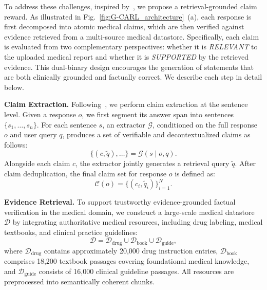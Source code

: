 \documentclass[letterpaper]{article} %
\begin{document}
To address these challenges, inspired by~\cite{factscore,veriscore}, we propose a retrieval-grounded claim  reward. 
As illustrated in Fig.~\ref{fig:G-CARL_architecture}~(a), each response is first decomposed into atomic medical claims, which are then verified against evidence retrieved from a multi-source medical datastore. 
Specifically, each claim is evaluated from two complementary perspectives: whether it is \emph{RELEVANT} to the uploaded medical report and whether it is \emph{SUPPORTED} by the retrieved evidence.
This dual-binary design encourages the generation of statements that are both clinically grounded and factually correct. We describe each step in detail below.

\vspace{2pt}
\noindent \textbf{Claim Extraction.}
Following~\cite{veriscore}, we perform claim extraction at the sentence level. Given a response $o$, we first segment its answer span into sentences $\{s_1, \dots, s_n\}$. For each sentence $s$, an extractor $\mathcal{G}$, conditioned on the full response $o$ and user query $q$, produces a set of verifiable and decontextualized claims as follows:
\begin{equation}
\{(c, \tilde{q}), \dots\}
=
\mathcal{G}(s \mid o, q).
\end{equation}
Alongside each claim $c$, the extractor jointly generates a retrieval query $\tilde{q}$. 
After claim deduplication, the final claim set for response $o$ is defined as:
\begin{equation}
\mathcal{C}(o)=\{(c_i,\tilde{q}_i)\}_{i=1}^{N}.
\end{equation}


\vspace{2pt}
\noindent \textbf{Evidence Retrieval.}
To support trustworthy evidence-grounded factual verification in the medical domain, we construct a large-scale medical datastore $\mathcal{D}$ by integrating authoritative medical resources, including drug labeling, medical textbooks, and clinical practice guidelines:
\begin{equation}
\mathcal{D} = \mathcal{D}_{\text{drug}} \cup \mathcal{D}_{\text{book}} \cup \mathcal{D}_{\text{guide}},
\end{equation}
where $\mathcal{D}_{\text{drug}}$ contains approximately 20,000 drug instruction entries, $\mathcal{D}_{\text{book}}$ comprises 18,200 textbook passages covering foundational medical knowledge, and $\mathcal{D}_{\text{guide}}$ consists of 16,000 clinical guideline passages. All resources are preprocessed into semantically coherent chunks.
\end{document}

